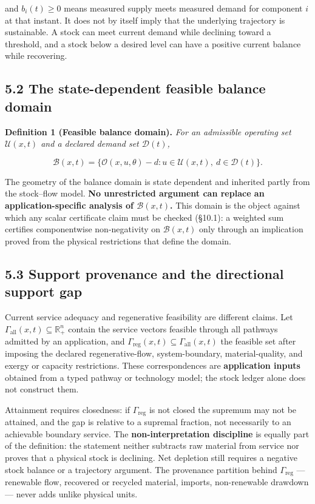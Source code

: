 \documentclass[11pt]{article}
\begin{document}
and \(b_i(t)\ge0\) means measured supply meets measured demand for component \(i\) at that instant. It does not by itself imply that the underlying trajectory is sustainable. A stock can meet current demand while declining toward a threshold, and a stock below a desired level can have a positive current balance while recovering.

\subsection*{5.2 The state-dependent feasible balance domain}\label{52-the-state-dependent-feasible-balance-domain}

\textbf{Definition 1 (Feasible balance domain).} \emph{For an admissible operating set \(\mathcal{U}(x,t)\) and a declared demand set \(\mathcal{D}(t)\),} 

$$\mathcal{B}(x,t) = \{ \mathcal{O}(x,u,\theta) - d : u \in \mathcal{U}(x,t),\ d \in \mathcal{D}(t) \}.$$



The geometry of the balance domain is state dependent and inherited partly from the stock--flow model. \textbf{No unrestricted argument can replace an application-specific analysis of \(\mathcal B(x,t)\).} This domain is the object against which any scalar certificate claim must be checked (\S10.1): a weighted sum certifies componentwise non-negativity on \(\mathcal B(x,t)\) only through an implication proved from the physical restrictions that define the domain.

\subsection*{5.3 Support provenance and the directional support gap}\label{53-support-provenance-and-the-directional-support-gap}

Current service adequacy and regenerative feasibility are different claims. Let \(\Gamma_{\mathrm{all}}(x,\allowbreak{}t)\subseteq\mathbb R^n_+\allowbreak{}\) contain the service vectors feasible through all pathways admitted by an application, and \(\Gamma_{\mathrm{reg}}(x,\allowbreak{}t)\subseteq\Gamma_{\mathrm{all}}(x,\allowbreak{}t)\) the feasible set after imposing the declared regenerative-flow, system-boundary, material-quality, and exergy or capacity restrictions. These correspondences are \textbf{application inputs} obtained from a typed pathway or technology model; the stock ledger alone does not construct them.

Attainment requires closedness: if \(\Gamma_{\mathrm{reg}}\) is not closed the supremum may not be attained, and the gap is relative to a supremal fraction, not necessarily to an achievable boundary service. The \textbf{non-interpretation discipline} is equally part of the definition: the statement neither subtracts raw material from service nor proves that a physical stock is declining. Net depletion still requires a negative stock balance or a trajectory argument. The provenance partition behind \(\Gamma_{\mathrm{reg}}\) --- renewable flow, recovered or recycled material, imports, non-renewable drawdown --- never adds unlike physical units.
\end{document}
